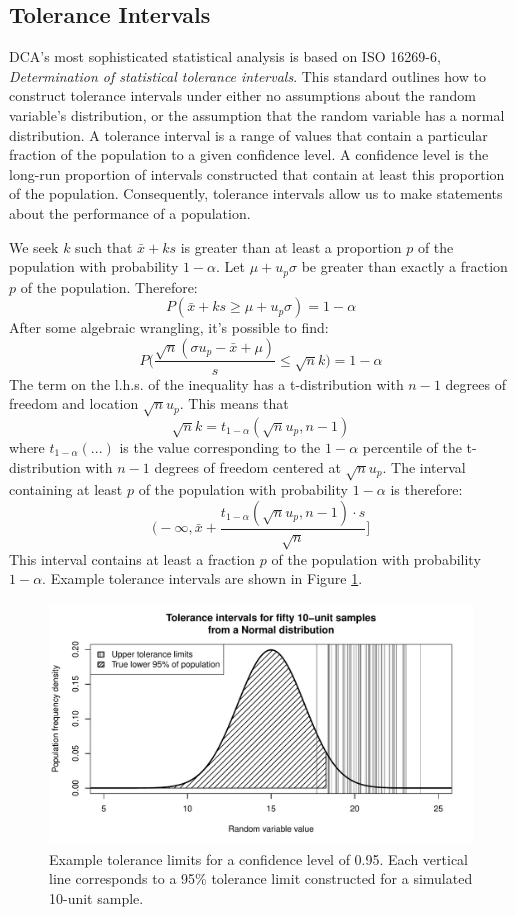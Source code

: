 \documentclass[11pt,a4paper,article]{memoir} %
\begin{document}
\subsection{Tolerance Intervals}
DCA's most sophisticated statistical analysis is based on ISO 16269-6, \emph{Determination of statistical tolerance intervals}. This standard outlines how to construct tolerance intervals under either no assumptions about the random variable's distribution, or the assumption that the random variable has a normal distribution. A tolerance interval is a range of values that contain a particular fraction of the population to a given confidence level. A confidence level is the long-run proportion of intervals constructed that contain at least this proportion of the population. Consequently, tolerance intervals allow us to make statements about the performance of a population.
\par
We seek $k$ such that $\bar{x} + ks$ is greater than at least a proportion $p$ of the population with probability $1 - \alpha$. Let $\mu + u_p \sigma$ be greater than exactly a fraction $p$ of the population. Therefore:
\[
	P(\bar{x} + ks \geq \mu + u_p \sigma) = 1 - \alpha
\]
After some algebraic wrangling, it's possible to find:
\[
	P\Big(\frac{\sqrt{n}(\sigma u_p - \bar{x} + \mu)}{s} \leq \sqrt{n}k\Big) = 1 - \alpha
\]
The term on the l.h.s. of the inequality has a t-distribution with $n - 1$ degrees of freedom and location $\sqrt{n}u_p$. This means that 
\[
	\sqrt{n}k = t_{1 - \alpha}(\sqrt{n}u_p, n - 1)
\]
where $t_{1 - \alpha}(...)$ is the value corresponding to the $1 - \alpha$ percentile of the t-distribution with $n - 1$ degrees of freedom centered at $\sqrt{n}u_p$. The interval containing at least $p$ of the population with probability $1 - \alpha$ is therefore:
\[
	\Big(-\infty, \bar{x} + \frac{t_{1 - \alpha}(\sqrt{n}u_p, n - 1)\cdot s}{\sqrt{n}}\Big]
\]
This interval contains at least a fraction $p$ of the population with probability $1 - \alpha$. Example tolerance intervals are shown in Figure \ref{fig:tolerance_intervals}.
\begin{figure}
\includegraphics[width=\textwidth]{tolerance_intervals.pdf}
\caption{Example tolerance limits for a confidence level of 0.95. Each vertical line corresponds to a 95\% tolerance limit constructed for a simulated 10-unit sample.}
\label{fig:tolerance_intervals}
\end{figure}
\end{document}
